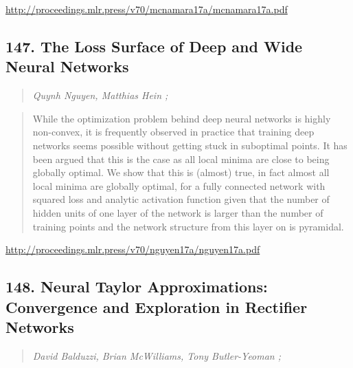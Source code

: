 \documentclass{article}
\begin{document}
\href{http://proceedings.mlr.press/v70/mcnamara17a/mcnamara17a.pdf}{http://proceedings.mlr.press/v70/mcnamara17a/mcnamara17a.pdf}

\subsection{147. The Loss Surface of Deep and Wide Neural Networks}

\begin{quote}
\footnotesize{\textit{Quynh Nguyen, Matthias Hein ;}}

\end{quote}

\begin{quote}
    While the optimization problem behind deep neural networks is highly non-convex, it is frequently observed in practice that training deep networks seems possible without getting stuck in suboptimal points. It has been argued that this is the case as all local minima are close to being globally optimal. We show that this is (almost) true, in fact almost all local minima are globally optimal, for a fully connected network with squared loss and analytic activation function given that the number of hidden units of one layer of the network is larger than the number of training points and the network structure from this layer on is pyramidal.  
\end{quote}

\href{http://proceedings.mlr.press/v70/nguyen17a/nguyen17a.pdf}{http://proceedings.mlr.press/v70/nguyen17a/nguyen17a.pdf}

\subsection{148. Neural Taylor Approximations: Convergence and Exploration in Rectifier Networks}

\begin{quote}
\footnotesize{\textit{David Balduzzi, Brian McWilliams, Tony Butler-Yeoman ;}}

\end{quote}
\end{document}
